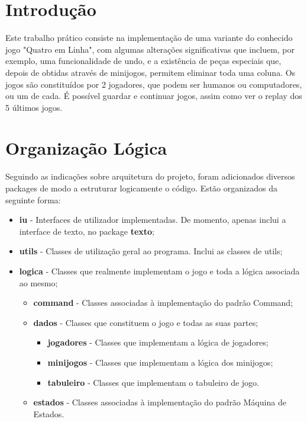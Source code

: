 \documentclass[11pt]{article}
\begin{document}
	
	
	\tableofcontents
	\pagebreak
	
	\large
	\section{Introdução}
	
	\normalsize
	Este trabalho prático consiste na implementação de uma variante do conhecido jogo "Quatro em Linha", com algumas alterações significativas que incluem, por exemplo, uma funcionalidade de undo, e a existência de peças especiais que, depois de obtidas através de minijogos, permitem eliminar toda uma coluna. Os jogos são constituídos por 2 jogadores, que podem ser humanos ou computadores, ou um de cada. É possível guardar e continuar jogos, assim como ver o replay dos 5 últimos jogos. 
	
	\large
	\section{Organização Lógica}
	\normalsize
	
	Seguindo as indicações sobre arquitetura do projeto, foram adicionados diversos packages de modo a estruturar logicamente o código. Estão organizados da seguinte forma:
	
	\begin{itemize}
		\item \textbf{iu} - Interfaces de utilizador implementadas. De momento, apenas inclui a interface de texto, no package \textbf{texto};
		\item \textbf{utils} - Classes de utilização geral ao programa. Inclui as classes de utils;
		\item \textbf{logica} - Classes que realmente implementam o jogo e toda a lógica associada ao mesmo;
		\begin{itemize}
			\item \textbf{command} - Classes associadas à implementação do padrão Command;
			\item \textbf{dados} - Classes que constituem o jogo e todas as suas partes;
			\begin{itemize}
				\item \textbf{jogadores} - Classes que implementam a lógica de jogadores;
				\item \textbf{minijogos} - Classes que implementam a lógica dos minijogos;
				\item \textbf{tabuleiro} - Classes que implementam o tabuleiro de jogo.
			\end{itemize}
			\item \textbf{estados} - Classes associadas à implementação do padrão Máquina de Estados.
		\end{itemize}
	\end{itemize}
\end{document}
